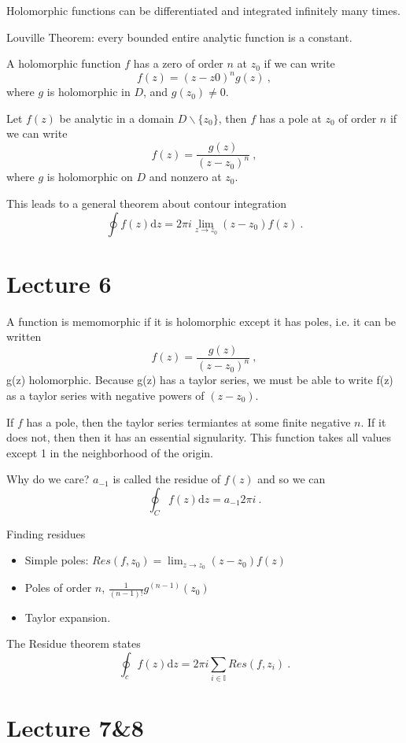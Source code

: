 \documentclass[11pt, a4paper]{article}
\begin{document}
Holomorphic functions can be differentiated and integrated infinitely many times.

Louville Theorem: every bounded entire analytic function is a constant.

A holomorphic function $f$ has a zero of order $n$ at $z_0$ if we can write
$$
	f(z) = (z-z0)^ng(z)~,
$$
where $g$ is holomorphic in $D$, and $g(z_0) \neq 0$.

Let $f(z)$ be analytic in a domain $D \backslash \{z_0\}$, then $f$ has a pole at $z_0$ of order $n$ if we can write
$$
	f(z) = \frac{g(z)}{(z-z_0)^n}~,
$$
where $g$ is holomorphic on $D$ and nonzero at $z_0$.

This leads to a general theorem about contour integration
$$
	\oint f(z) \mathrm{d}z = 2\pi i \lim_{z\rightarrow z_0} (z-z_0)f(z)~.
$$

\section{Lecture 6}

A function is memomorphic if it is holomorphic except it has poles, i.e. it can be written
$$
	f(z) = \frac{g(z)}{(z-z_0)^n}~,
$$
g(z) holomorphic. Because g(z) has a taylor series, we must be able to write f(z) as a taylor series with negative powers of $(z-z_0)$.

If $f$ has a pole, then the taylor series termiantes at some finite negative $n$.
If it does not, then then it has an essential signularity. This function takes all values except 1 in the neighborhood of the origin.

Why do we care? $a_{-1}$ is called the residue of $f(z)$ and so we can 
$$
	\oint_C f(z) \mathrm{d}z = a_{-1} 2 \pi i~.
$$

Finding residues
\begin{itemize}
	\item Simple poles: $Res(f, z_0) = \lim_{z\rightarrow z_0} (z-z_0) f(z)$
	\item Poles of order $n$, $\frac{1}{(n-1)!} g^{(n-1)}(z_0)$
	\item Taylor expansion.
\end{itemize}

The Residue theorem states
$$
	\oint_c f(z) \mathrm{d}z = 2\pi i \sum_{i\in \mathbb{I}} Res(f, z_i)~.
$$

\section{Lecture 7&8}
\end{document}

